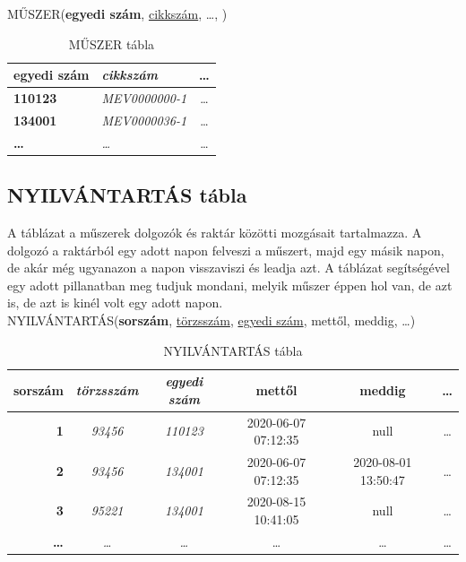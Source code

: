 \documentclass[a4paper,12pt]{report}
\newcommand{\pk}[1]{\textbf{#1}} %
\newcommand{\fk}[1]{\underline{#1}} %
\newcommand{\tabla}[1]{\noindent\MakeUppercase{#1}} %
\begin{document}
\tabla{műszer}(\pk{egyedi szám}, \fk{cikkszám}, \dots, )

\begin{table}[ht!]
	\centering
	\begin{footnotesize}
	\begin{tabular}[t]{|l|l|c|}
		\hline
		\textbf{egyedi szám}&\textit{cikkszám}&\dots \\ \hline
		\textbf{110123}&\textit{MEV0000000-1}&\dots\\
		\textbf{134001}&\textit{MEV0000036-1}&\dots\\
		\textbf{\dots}&\textit{\dots}&\dots\\
	\end{tabular}
\end{footnotesize}
	\caption{MŰSZER tábla}\label{tabMUSZER}
\end{table}


\subsection{NYILVÁNTARTÁS tábla}
A táblázat a műszerek dolgozók és raktár közötti mozgásait tartalmazza. A dolgozó a raktárból egy adott napon felveszi a műszert, majd egy másik napon, de akár még ugyanazon a napon visszaviszi és leadja azt. A táblázat segítségével egy adott pillanatban meg tudjuk mondani, melyik műszer éppen hol van, de azt is, de azt is kinél volt egy adott napon. \\

\tabla{nyilvántartás}(\pk{sorszám}, \fk{törzsszám}, \fk{egyedi szám}, mettől, meddig, \dots)\\

\begin{table}[ht!]
	\centering
	\begin{footnotesize}
	\begin{tabular}[t]{|r|c|c|c|c|c|}
		\hline
		\textbf{sorszám}&\textit{törzsszám}&\textit{egyedi szám}&mettől&meddig&\dots \\ \hline
		\textbf{1}&\textit{93456}&\textit{110123}&2020-06-07 07:12:35&null&\dots\\
		\textbf{2}&\textit{93456}&\textit{134001}&2020-06-07 07:12:35&2020-08-01 13:50:47&\dots\\
		\textbf{3}&\textit{95221}&\textit{134001}&2020-08-15 10:41:05&null&\dots\\
		\textbf{\dots}&\textit{\dots}&\textit{\dots}&\dots&\dots&\dots\\
	\end{tabular}
\end{footnotesize}
	\caption{NYILVÁNTARTÁS tábla}\label{tabNYILVANTARTAS}
\end{table}
\end{document}
